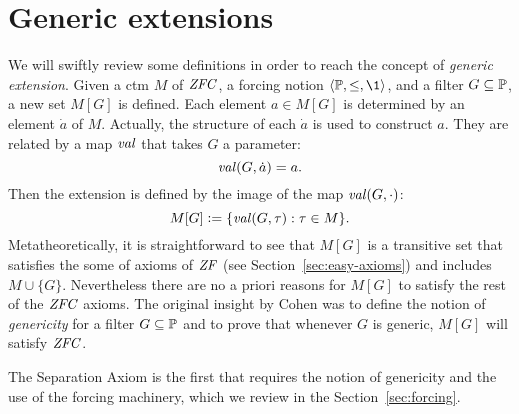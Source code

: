 \section{Generic extensions}
\label{sec:generic-extensions}
We will swiftly review some definitions in order to reach the concept
of \emph{generic extension}. Given a ctm $M$ of $\mathit{ZFC}$, a forcing
notion $\lb\PP,\leq,\1\rb$, and a filter
$G\subseteq\mathbb{P}$, a new set $M[G]$ is defined. Each element $a\in M[G]$ is
determined by an element $\dot a$ of $M$. Actually, the structure of
each $\dot a$ is used to construct $a$. They are related by a
map $\operatorname{\mathit{val}}$ that takes $G$ a parameter:
\[
\operatorname{\mathit{val}}(G,\dot a) = a.
\] 
Then the extension is defined by the image of the map $\operatorname{\mathit{val}}(G,\cdot)$:
\[
M[G] \mathrel{\mathop:}= \{\operatorname{\mathit{val}}(G,\tau): \tau\in M\}.
\]
Metatheoretically, it is straightforward to see that $M[G]$ is a
transitive set that satisfies the some of axioms of $\mathit{ZF}$ (see
Section~\ref{sec:easy-axioms}) and 
includes $M\cup\{G\}$. Nevertheless there are no a priori reasons for
$M[G]$ to satisfy the rest of the $\mathit{ZFC}$ 
axioms. The original insight by Cohen was to define the notion of
\emph{genericity} for a filter $G\subseteq\mathbb{P}$ and to prove that whenever
$G$ is generic, $M[G]$ will satisfy $\mathit{ZFC}$.

The Separation Axiom  is the first that requires the notion of
genericity and the use of the forcing machinery, which we review in
the Section~\ref{sec:forcing}.

